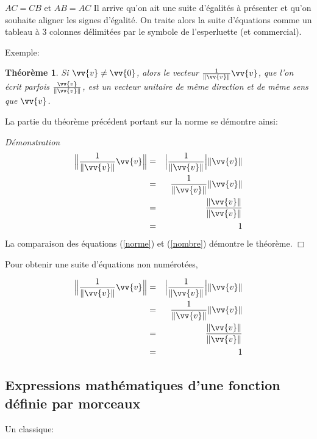 \documentclass[10pt]{article}
\newtheorem{theorem}{Théorème}
\newenvironment{proof}
{\par\noindent
\textit{Démonstration}\ }
{
\hfill{$\Box$}
}
\begin{document}
\(AC=CB\) et \(AB=AC\) Il arrive qu'on ait une suite d'égalités à
présenter et qu'on souhaite aligner les signes d'égalité. On traite
alors la suite d'équations comme un tableau à 3 colonnes délimitées par
le symbole de l'esperluette (et commercial).

Exemple:

\begin{theorem} Si $\vv{v} \neq \vv{0}$, alors le vecteur $\frac{1}{\| \vv{v}\|}\vv{v}$, que l'on écrit parfois $\frac{\vv{v}}{\| \vv{v}\|}$, est un vecteur unitaire de même direction et de même sens que $\vv{v}$.
\end{theorem}

La partie du théorème précédent portant sur la norme se démontre ainsi:

\begin{proof}
\begin{eqnarray}
\Big\|{\frac{1}{\| \vv{v}\|}\vv{v}} \Big\|&=& \Big |\frac{1}{\| \vv{v}\|} \Big |\| \vv{v}\|\label{norme}\\
&=&\frac{1}{\| \vv{v}\|}\| \vv{v}\|  \nonumber\\
&=&\frac{\| \vv{v}\|}{\| \vv{v}\|} \nonumber\\
&=&1 \label{nombre}
\end{eqnarray}
La comparaison des équations (\ref{norme}) et (\ref{nombre}) démontre le théorème.\end{proof}

Pour obtenir une suite d'équations non numérotées,

\begin{eqnarray*}
\Big\|{\frac{1}{\| \vv{v}\|}\vv{v}} \Big\|&=& \Big |\frac{1}{\| \vv{v}\|} \Big |\| \vv{v}\| \\
&=&\frac{1}{\| \vv{v}\|}\| \vv{v}\| \\
&=&\frac{\| \vv{v}\|}{\| \vv{v}\|} \\
&=&1
\end{eqnarray*}

\hypertarget{expressions-mathuxe9matiques-dune-fonction-duxe9finie-par-morceaux}{%
\subsection{\texorpdfstring{Expressions mathématiques d'une fonction
définie par morceaux
\label{morceaux}}{Expressions mathématiques d'une fonction définie par morceaux }}\label{expressions-mathuxe9matiques-dune-fonction-duxe9finie-par-morceaux}}

Un classique:
\end{document}

